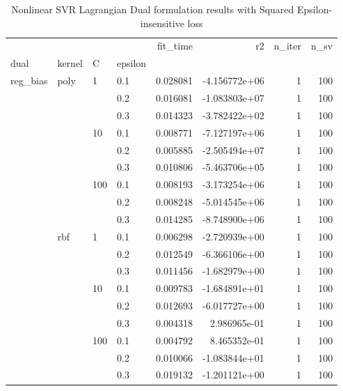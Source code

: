 \begin{table}[H]
\centering
\caption{Nonlinear SVR Lagrangian Dual formulation results with Squared Epsilon-insensitive loss}
\label{nonlinear_lagrangian_dual_l2_svr_cv_results}
\begin{tabular}{llllrrrr}
\toprule
         &     &     &     &  fit\_time &            r2 &  n\_iter &  n\_sv \\
dual & kernel & C & epsilon &           &               &         &       \\
\midrule
reg\_bias & poly & 1   & 0.1 &  0.028081 & -4.156772e+06 &       1 &   100 \\
         &     &     & 0.2 &  0.016081 & -1.083803e+07 &       1 &   100 \\
         &     &     & 0.3 &  0.014323 & -3.782422e+02 &       1 &   100 \\
         &     & 10  & 0.1 &  0.008771 & -7.127197e+06 &       1 &   100 \\
         &     &     & 0.2 &  0.005885 & -2.505494e+07 &       1 &   100 \\
         &     &     & 0.3 &  0.010806 & -5.463706e+05 &       1 &   100 \\
         &     & 100 & 0.1 &  0.008193 & -3.173254e+06 &       1 &   100 \\
         &     &     & 0.2 &  0.008248 & -5.014545e+06 &       1 &   100 \\
         &     &     & 0.3 &  0.014285 & -8.748900e+06 &       1 &   100 \\
         & rbf & 1   & 0.1 &  0.006298 & -2.720939e+00 &       1 &   100 \\
         &     &     & 0.2 &  0.012549 & -6.366106e+00 &       1 &   100 \\
         &     &     & 0.3 &  0.011456 & -1.682979e+00 &       1 &   100 \\
         &     & 10  & 0.1 &  0.009783 & -1.684891e+01 &       1 &   100 \\
         &     &     & 0.2 &  0.012693 & -6.017727e+00 &       1 &   100 \\
         &     &     & 0.3 &  0.004318 &  2.986965e-01 &       1 &   100 \\
         &     & 100 & 0.1 &  0.004792 &  8.465352e-01 &       1 &   100 \\
         &     &     & 0.2 &  0.010066 & -1.083844e+01 &       1 &   100 \\
         &     &     & 0.3 &  0.019132 & -1.201121e+00 &       1 &   100 \\
\bottomrule
\end{tabular}
\end{table}
